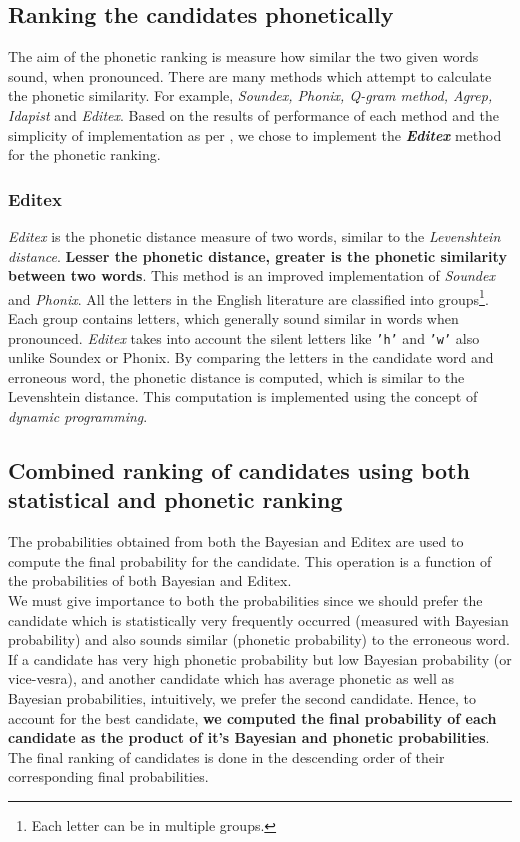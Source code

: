 \documentclass{article}
\begin{document}
		\subsection{Ranking the candidates phonetically}
			The aim of the phonetic ranking is measure how similar the two given words sound, when pronounced. There are many methods which attempt to calculate the phonetic similarity. For example, \textit{Soundex, Phonix, Q-gram method, Agrep, Idapist} and \textit{Editex}. Based on the results of performance of each method and the simplicity of implementation as per \cite{phonetic}, we chose to implement the \textbf{\textit{Editex}} method for the phonetic ranking.
			\subsubsection{Editex}
				\textit{Editex} is the phonetic distance measure of two words, similar to the \textit{Levenshtein distance}. \textbf{Lesser the phonetic distance, greater is the phonetic similarity between two words}. This method is an improved implementation of \textit{Soundex} and \textit{Phonix}. All the letters in the English literature are classified into groups\footnote{Each letter can be in multiple groups.}. Each group contains letters, which generally sound similar in words when pronounced. \textit{Editex} takes into account the silent letters like \texttt{'h'} and \texttt{'w'} also unlike Soundex or Phonix. By comparing the letters in the candidate word and erroneous word, the phonetic distance is computed, which is similar to the Levenshtein distance. This computation is implemented using the concept of \textit{dynamic programming}.
			
		\subsection{Combined ranking of candidates using both statistical and phonetic ranking}	
			The probabilities obtained from both the Bayesian and Editex are used to compute the final probability for the candidate. This operation is a function of the probabilities of both Bayesian and Editex.\\ 
			We must give importance to both the probabilities since we should prefer the candidate which is statistically very frequently occurred (measured with Bayesian probability) and also sounds similar (phonetic probability) to the erroneous word.\\
			If a candidate has very high phonetic probability but low Bayesian probability (or vice-vesra), and another candidate which has average phonetic as well as Bayesian probabilities, intuitively, we prefer the second candidate. Hence, to account for the best candidate, \textbf{we computed the final probability of each candidate as the product of it's Bayesian and phonetic probabilities}.\\
			The final ranking of candidates is done in the descending order of their corresponding final probabilities.
		
\end{document}
